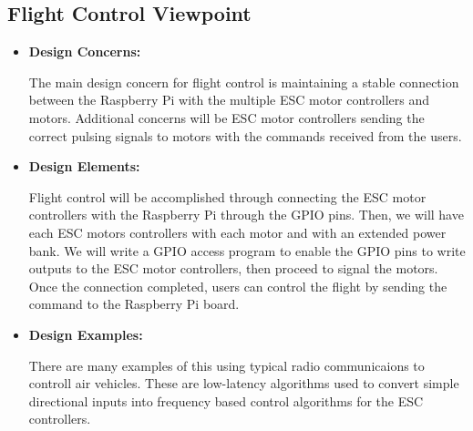 \documentclass[onecolumn, draftclsnofoot,10pt, compsoc]{IEEEtran}
\begin{document}
\subsection{Flight Control Viewpoint} %
\begin{itemize}
\item{ \textbf{Design Concerns:}}

The main design concern for flight control is maintaining a stable connection between the Raspberry Pi with the multiple ESC motor controllers and motors. Additional concerns will be ESC motor controllers sending the correct pulsing signals to motors with the commands received from the users. \\
\item{ \textbf{Design Elements:}}

Flight control will be accomplished through connecting the ESC motor controllers with the Raspberry Pi through the GPIO pins. Then, we will have each ESC motors controllers with each motor and with an extended power bank. We will write a GPIO access program to enable the GPIO pins to write outputs to the ESC motor controllers, then proceed to signal the motors. Once the connection completed, users can control the flight by sending the command to the Raspberry Pi board.\\

\item{ \textbf{Design Examples:}} %

There are many examples of this using typical radio communicaions to controll air vehicles. These are low-latency algorithms used to convert simple directional inputs into frequency based control algorithms for the ESC controllers. \\

\end{itemize}
\end{document}
